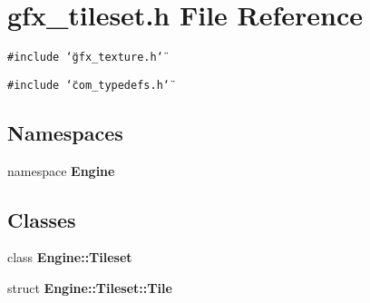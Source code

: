 \section{gfx\_\-tileset.h File Reference}
\label{gfx__tileset_8h}
{\tt \#include \char`\"{}gfx\_\-texture.h\char`\"{}}\par
{\tt \#include \char`\"{}com\_\-typedefs.h\char`\"{}}\par
\subsection*{Namespaces}
\begin{CompactItemize}
\item 
namespace {\bf Engine}
\end{CompactItemize}
\subsection*{Classes}
\begin{CompactItemize}
\item 
class {\bf Engine::Tileset}
\item 
struct {\bf Engine::Tileset::Tile}
\end{CompactItemize}
